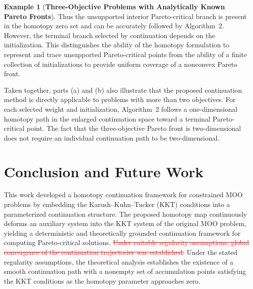 \documentclass[11pt,pdflatex,sn-mathphys-ay]{sn-jnl}%
\theoremstyle{definition}
\theoremstyle{thmstyleone}%
\theoremstyle{thmstyletwo}%
\newtheorem{example}{Example}%
\theoremstyle{thmstylethree}%
\newcommand{\del}[1]{\textcolor{red}{\sout{#1}}}
\newcommand{\add}[1]{\textcolor{revisionblue}{#1}}
\begin{document}
\begin{example}[\textbf{Three-Objective Problems with Analytically Known Pareto Fronts}]
		Thus the unsupported interior Pareto-critical branch is present in the
		homotopy zero set and can be accurately followed by Algorithm~2.
		However, the terminal branch selected by continuation depends on the
		initialization. This distinguishes the ability of the homotopy
		formulation to represent and trace unsupported Pareto-critical points
		from the ability of a finite collection of initializations to provide
		uniform coverage of a nonconvex Pareto front.
		
		Taken together, parts (a) and (b) also illustrate that the proposed
		continuation method is directly applicable to problems with more than
		two objectives. For each selected weight and initialization,
		Algorithm~2 follows a one-dimensional homotopy path in the enlarged
		continuation space toward a terminal Pareto-critical point. The fact
		that the three-objective Pareto front is two-dimensional does not
		require an individual continuation path to be two-dimensional.
		
	\end{example}
	\section{Conclusion and Future Work} \label{sec:conclusion}
	This work developed a homotopy continuation framework for constrained MOO problems by embedding the Karush--Kuhn--Tucker (KKT) conditions into a parameterized continuation structure. The proposed homotopy map continuously deforms an auxiliary system into the KKT system of the original MOO problem, yielding a deterministic and theoretically grounded continuation framework for computing Pareto-critical solutions. 
	\del{Under suitable regularity assumptions,
		global convergence of the continuation
		trajectories was established.}
	\add{Under the stated regularity assumptions,
		the theoretical analysis establishes the
		existence of a smooth continuation path
		with a nonempty set of accumulation points
		satisfying the KKT conditions as the
		homotopy parameter approaches zero.}
	
\end{document}
